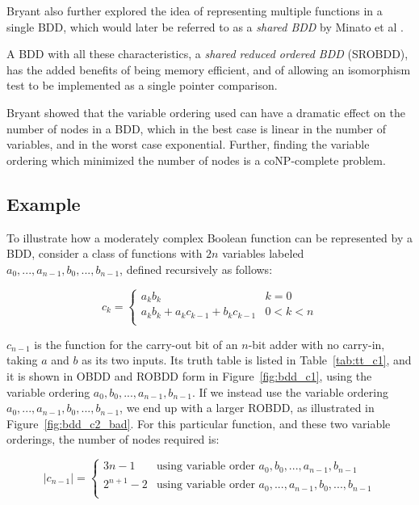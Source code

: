 \documentclass[a4paper,11pt]{kth-mag}
\begin{document}
Bryant also further explored the idea of representing multiple functions in a single BDD, which would later be referred to as a \emph{shared BDD} by Minato et al \cite{minato90}.

A BDD with all these characteristics, a \emph{shared reduced ordered BDD} (SROBDD), has the added benefits of being memory efficient, and of allowing an isomorphism test to be implemented as a single pointer comparison.

Bryant showed that the variable ordering used can have a dramatic effect on the number of nodes in a BDD, which in the best case is linear in the number of variables, and in the worst case exponential.
Further, finding the variable ordering which minimized the number of nodes is a coNP-complete problem. %

\subsection{Example}

To illustrate how a moderately complex Boolean function can be represented by a BDD, consider a class of functions with $2n$ variables labeled $a_0,...,a_{n-1},b_0,...,b_{n-1}$, defined recursively as follows:

$$
  c_k = \left\{
  \begin{array}{ll}
    a_k b_k                             & k = 0 \\
    a_k b_k + a_k c_{k-1} + b_k c_{k-1} & 0 < k < n \\
  \end{array}\right.
$$

$c_{n-1}$ is the function for the carry-out bit of an $n$-bit adder with no carry-in, taking $a$ and $b$ as its two inputs.
Its truth table is listed in Table~\ref{tab:tt_c1}, and it is shown in OBDD and ROBDD form in Figure~\ref{fig:bdd_c1}, using the variable ordering $a_0,b_0,...,a_{n-1},b_{n-1}$.
If we instead use the variable ordering $a_0,...,a_{n-1},b_0,...,b_{n-1}$, we end up with a larger ROBDD, as illustrated in Figure~\ref{fig:bdd_c2_bad}.
For this particular function, and these two variable orderings, the number of nodes required is:

$$
  |c_{n-1}| = \left\{
  \begin{array}{ll}
    3n-1      & \textrm{using variable order $a_0,b_0,...,a_{n-1},b_{n-1}$} \\
    2^{n+1}-2 & \textrm{using variable order $a_0,...,a_{n-1},b_0,...,b_{n-1}$} \\
  \end{array}\right.
$$
\end{document}
